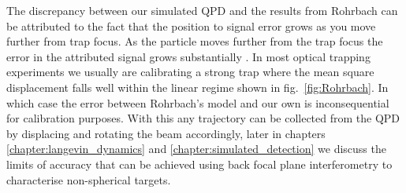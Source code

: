 The discrepancy between our simulated QPD and the results 
from Rohrbach can be attributed to the fact that the position 
to signal error grows as you move further from trap focus. 
As the particle moves further from the trap focus the error 
in the attributed signal grows substantially \cite{Rohrbach2002}.
In most optical trapping experiments we usually are calibrating 
a strong trap where the mean square displacement falls well within 
the linear regime shown in fig.~\ref{fig:Rohrbach}. In which case 
the error between Rohrbach's model and our own is inconsequential 
for calibration purposes. With this any trajectory can be collected 
from the QPD by displacing and rotating the beam accordingly, 
later in chapters \ref{chapter:langevin_dynamics} and \ref{chapter:simulated_detection} we discuss the limits of 
accuracy that can be achieved using back focal plane interferometry 
to characterise non-spherical targets. 
